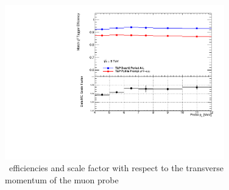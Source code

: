 \begin{figure}[htbp]
  \centering
  \includegraphics[width=0.85\textwidth]{PartCalibration2012/Plots/SFPlots/pt_smt.pdf}
  \caption{\xsm\ efficiencies and scale factor with respect to the transverse momentum of the muon probe} \label{fig:CalibrationMomentumResults}
\end{figure}


